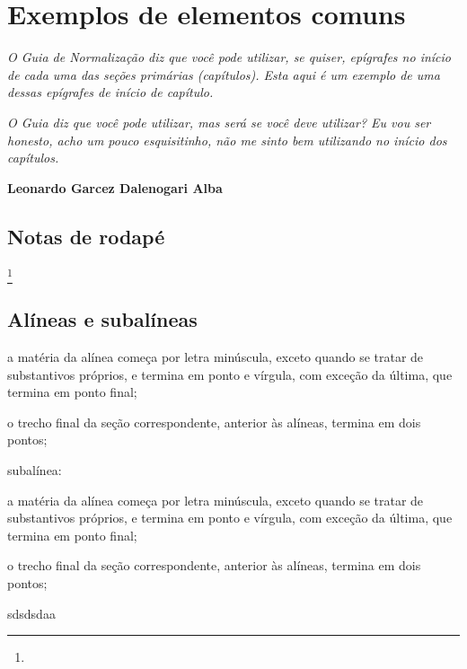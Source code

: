 \chapter{Exemplos de elementos comuns}
\hspace{\fill}
\begin{minipage}{6cm}
    \begin{singlespace} %
        \textit{O Guia de Normalização diz que você pode utilizar, se quiser, epígrafes no início de cada uma das seções primárias (capítulos). Esta aqui é um exemplo de uma dessas epígrafes de início de capítulo.} 
        
        \textit{O Guia diz que você pode utilizar, mas será se você deve utilizar? Eu vou ser honesto, acho um pouco esquisitinho, não me sinto bem utilizando no início dos capítulos.}
        
        \textbf{Leonardo Garcez Dalenogari Alba}
    \end{singlespace}
\end{minipage}

\section{Notas de rodapé}
  \lipsum[10]\footnote{\lipsum*[11]}

\section{Alíneas e subalíneas}
  \lipsum[12]
  \begin{alinea}
    \item a matéria da alínea começa por letra minúscula, exceto quando se tratar de substantivos próprios, e termina em ponto e vírgula, com exceção da última, que termina em ponto final; 
    \item o trecho final da seção correspondente, anterior às alíneas, termina em
    dois pontos;
    \item subalínea: 
    \begin{subalinea}
      \item a matéria da alínea começa por letra minúscula, exceto quando se tratar de     substantivos próprios, e termina em ponto e vírgula, com exceção da última, que termina em ponto final; 
      \item o trecho final da seção correspondente, anterior às alíneas, termina em
      dois pontos;
    \end{subalinea}
    \item sdsdsdaa
  \end{alinea}
  
